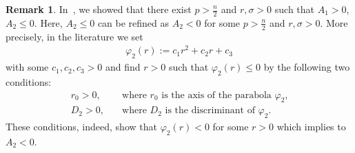 \documentclass[12pt,reqno,draft]{article}
\numberwithin{equation}{section}
\theoremstyle{theorem}
\theoremstyle{definition}
\newtheorem{remark}{Remark}[section]
\begin{document}
\begin{remark}
In~\cite[Proof of Lemma~3.3]{CMY-2020}, we showed that 
there exist $p>\frac{n}{2}$ and $r, \sigma>0$ such that 
$A_1>0$, $A_2 \le 0$. 
Here, $A_2 \le 0$ can be refined as $A_2<0$ 
for some $p>\frac{n}{2}$ and $r, \sigma>0$. 
More precisely, in the literature we set
    \begin{align*}%
        \varphi_2(r):=c_1r^2+c_2r+c_3
    \end{align*}
% 
 with some $c_1, c_2, c_3>0$ and find $r>0$ such that 
 $\varphi_2(r) \le 0$ by the following two conditions:
%
    \begin{align*}
         r_0>0, \quad &\mbox{where 
         $r_0$ is the axis of the parabola $\varphi_2$,}%
       \\
         D_2>0, \quad &\mbox{where $D_2$ 
         is the discriminant of $\varphi_2$.}%
    \end{align*}
These conditions, indeed, show that 
$\varphi_2(r)<0$ for some $r>0$ which implies to $A_2<0$. 
\end{remark}
\end{document}
